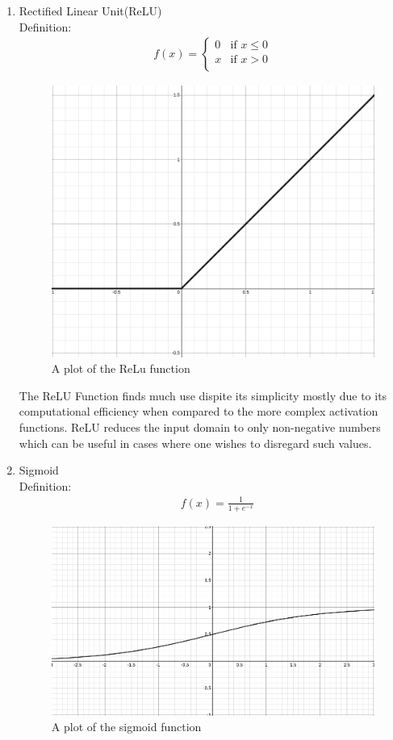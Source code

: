 \documentclass{article}
\begin{document}
\begin{enumerate}
\item Rectified Linear Unit(ReLU)\\
Definition: 
\begin{align*}
f(x) =
\begin{cases}
 0 & \text{if } x \leq 0 \\
 x & \text{if } x > 0 \\
\end{cases}
\end{align*}
\begin{figure}[H]
\centering
\caption{A plot of the ReLu function}
\includegraphics[scale=0.2]{relu.png}
\end{figure}
The ReLU Function finds much use dispite its simplicity mostly due to its computational efficiency when compared to the more complex activation functions. ReLU reduces the input domain to only non-negative numbers which can be useful in cases where one wishes to disregard such values. 
\item Sigmoid \\
Definition: 
\begin{align*}
&f(x) = \frac{1}{1 + e^{-x}}
\end{align*}
\begin{figure}[H]
\centering
\caption{A plot of the sigmoid function}
\includegraphics[scale=0.2]{sigmoid.png}

\end{figure}
\end{enumerate}
\end{document}
